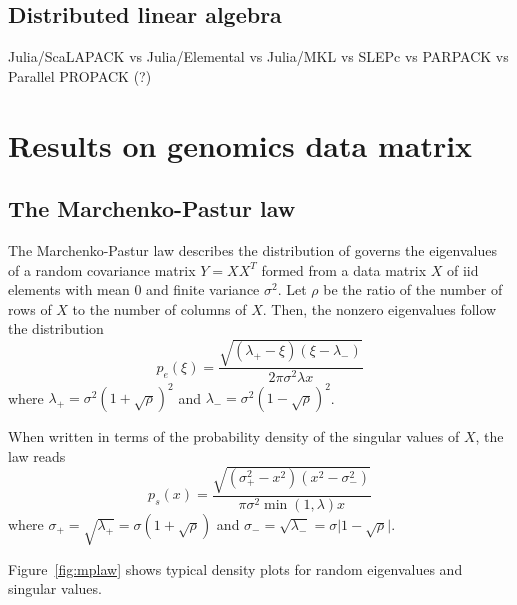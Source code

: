 \documentclass[final,leqno]{siamltex1213}
\begin{document}
\subsection{Distributed linear algebra}



Julia/ScaLAPACK vs Julia/Elemental vs Julia/MKL vs SLEPc vs PARPACK vs Parallel PROPACK (?)




\section{Results on genomics data matrix}


\subsection{The Marchenko-Pastur law}

The Marchenko-Pastur law describes the distribution of governs the eigenvalues
of a random covariance matrix $Y=XX^T$ formed from a data matrix $X$
of iid elements with mean 0 and finite variance $\sigma^2$.
Let $\rho$ be the ratio of the number of rows of $X$ to the number of columns of $X$.
Then, the nonzero eigenvalues follow the distribution
%
\begin{equation}
    p_e(\xi) = \frac {\sqrt{(\lambda_+-\xi)(\xi-\lambda_-)}} {2 \pi \sigma^2 \lambda x}
\end{equation}
%
where
$\lambda_+ = \sigma^2(1+\sqrt{\rho})^2$ and
$\lambda_- = \sigma^2(1-\sqrt{\rho})^2$.

When written in terms of the probability density of the singular values of $X$,
the law reads
%
\begin{equation}
    p_s(x) = \frac {\sqrt{(\sigma_+^2-x^2)(x^2-\sigma_-^2)}} {\pi \sigma^2 \min(1, \lambda) x}
\end{equation}
%
where
$\sigma_+ = \sqrt{\lambda_+} = \sigma(1+\sqrt{\rho})$ and
$\sigma_- = \sqrt{\lambda_-} = \sigma\vert1-\sqrt{\rho}\vert$.

Figure~\ref{fig:mplaw} shows typical density plots for random eigenvalues
and singular values.

\end{document}
